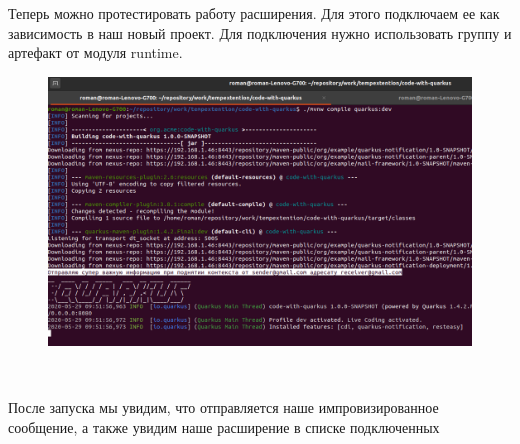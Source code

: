 \documentclass[russian,11pt]{article}
\begin{document}
Теперь можно протестировать работу расширения. Для этого подключаем ее как зависимость в наш новый проект. Для подключения нужно использовать группу и артефакт от модуля runtime.

\begin{figure}[H]
	\centering
	\includegraphics[width=\textwidth]{11}
\end{figure}
~

После запуска мы увидим, что отправляется наше импровизированное сообщение, а также увидим наше расширение в списке подключенных
\end{document}
